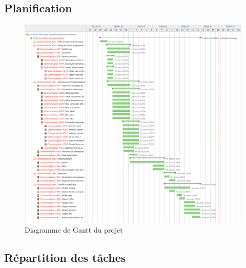 \documentclass[10pt]{scrreprt} %
\begin{document}
\subsection{Planification}

\begin{figure}[h!]
	\includegraphics[width=\textwidth]{./Pictures/Gantt.png}
	\caption{Diagramme de Gantt du projet}
\end{figure}

\subsection{Répartition des tâches}
\begin{appendix}
	\listoffigures
	\listoftables
\end{appendix}
\end{document}

